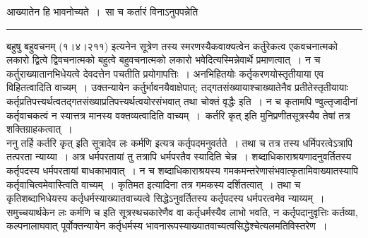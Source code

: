 \documentclass[11pt, openany]{book}
\begin{document}
{\bl आख्यातेन हि भावनोच्यते~।~सा च कर्तारं विनाऽनुपपन्नेति}\\
\hrule
\vspace{3mm}
\noindent
{\qt बहुषु बहुवचनम्} (१।४।२११) इत्यनेन सूत्रेण तस्य स्मरणस्यैकवाक्यत्वेन कर्तुरेकत्व एकवचनात्मको लकारो द्वित्वे द्विवचनात्मको बहुत्वे बहुवचनात्मको लकारो भवेदित्यस्मिन्नेवार्थे प्रमाणत्वात्~। {\br न च} कर्तुराख्यातानभिधेयत्वे देवदत्तेन पचतीति प्रयोगापत्तिः~। अनभिहितयोः कर्तृकरणयोस्तृतीयाया एव विहितत्वादिति वाच्यम्~। उक्तन्यायेन कर्तुर्भावनयैवाक्षेपात्; तद्गतसंख्यायाश्चाख्यातेनैव प्रतीतेस्तृतीयायाः कर्तृप्रतिपत्त्यर्थत्वतद्गतसंख्याप्रतिपत्त्यर्थत्वयोरसंभवात् तथा चोक्तं वृद्धैः इति~। न च कृतामपि ण्वुल्तृजादीनां कर्तृवाचकत्वं न स्यात्तत्र मानस्य वक्तव्यत्वादिति वाच्यम्~।~{\qt कर्तरि कृत्} इति मुनिप्रणीतसूत्रस्यैव तेषां तत्र शक्तिग्राहकत्वात्~।\\

 {\br ननु} तर्हि {\qt कर्तरि कृत्} इति सूत्रादेव {\qt लः कर्मणि} इत्यत्र कर्तृपदमनुवर्तते~। तथा च तत्र तस्य धर्मिपरत्वेऽत्रापि तत्परता न्याय्या~। अत्र धर्मपरतायां तु तत्रापि धर्मपरतैव स्यादिति चेन्न~। शब्दाधिकाराश्रयणादनुवर्तितस्य कर्तृपदस्य धर्मपरतायां बाधकाभावात्~। न च शब्दाधिकाराश्रयस्य गमकमन्तरेणासंभवात्कृतामिवाख्यातस्यापि
कर्तृवाचित्वमेवास्त्विति वाच्यम्~। कृतिमत इत्यादिना तत्र गमकस्य दर्शितत्वात्~। तथा च कृतिशब्दाभिधेयस्य कर्तृधर्मस्याख्यातवाच्यत्वे सिद्धेऽनुवर्तितस्य कर्तृपदस्य धर्मपरत्वमेव न्याय्यम्~। समुच्चयार्थकेन {\qt लः कर्मणि च} इति सूत्रस्थचकारेणैव वा कर्तृधर्मस्यैव लाभो भवति, न कर्तृपदानुवृत्तिः कर्तव्या, कल्पनालाघवात् पूर्वोक्तन्यायेन कर्तृधर्मस्य भावनारूपस्याख्यातवाच्यत्वसिद्धेश्चेत्यलमतिविस्तरेण~।\\
\end{document}
